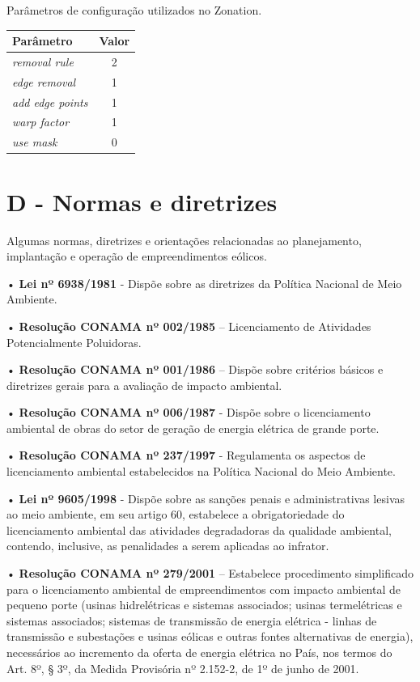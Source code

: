 \documentclass[
  oneside]{scrbook}
\begin{document}
Parâmetros de configuração utilizados no Zonation.

\begin{longtable}[t]{>{}lc}
\toprule
Parâmetro & Valor\\
\midrule
\em{removal rule} & 2\\
\em{edge removal} & 1\\
\em{add edge points} & 1\\
\em{warp factor} & 1\\
\em{use mask} & 0\\
\bottomrule
\end{longtable}

\newpage

\hypertarget{d---normas-e-diretrizes}{%
\chapter{D - Normas e diretrizes}\label{d---normas-e-diretrizes}}

Algumas normas, diretrizes e orientações relacionadas ao planejamento, implantação e operação de empreendimentos eólicos.

• \textbf{Lei nº 6938/1981} - Dispõe sobre as diretrizes da Política Nacional de Meio Ambiente.

• \textbf{Resolução CONAMA nº 002/1985} -- Licenciamento de Atividades Potencialmente Poluidoras.

• \textbf{Resolução CONAMA nº 001/1986} -- Dispõe sobre critérios básicos e diretrizes gerais para a avaliação de impacto ambiental.

• \textbf{Resolução CONAMA nº 006/1987} - Dispõe sobre o licenciamento ambiental de obras do setor de geração de energia elétrica de grande porte.

• \textbf{Resolução CONAMA nº 237/1997} - Regulamenta os aspectos de licenciamento ambiental estabelecidos na Política Nacional do Meio Ambiente.

• \textbf{Lei nº 9605/1998} - Dispõe sobre as sanções penais e administrativas lesivas ao meio ambiente, em seu artigo 60, estabelece a obrigatoriedade do licenciamento ambiental das atividades degradadoras da qualidade ambiental, contendo, inclusive, as penalidades a serem aplicadas ao infrator.

• \textbf{Resolução CONAMA nº 279/2001} -- Estabelece procedimento simplificado para o licenciamento ambiental de empreendimentos com impacto ambiental de pequeno porte (usinas hidrelétricas e sistemas associados; usinas termelétricas e sistemas associados; sistemas de transmissão de energia elétrica - linhas de transmissão e subestações e usinas eólicas e outras fontes alternativas de energia), necessários ao incremento da oferta de energia elétrica no País, nos termos do Art. 8º, § 3º, da Medida Provisória nº 2.152-2, de 1º de junho de 2001.
\end{document}
